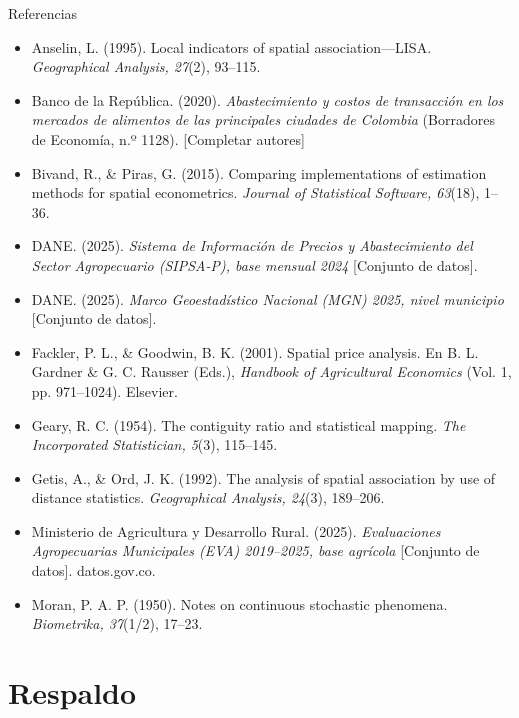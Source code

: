 \documentclass[aspectratio=169,11pt]{beamer}
\begin{document}
\begin{frame}{Referencias}
  \scriptsize
  \begin{itemize}
    \item[] Anselin, L. (1995). Local indicators of spatial association—LISA.
            \textit{Geographical Analysis, 27}(2), 93--115.
    \item[] Banco de la República. (2020). \textit{Abastecimiento y costos de transacción en los
            mercados de alimentos de las principales ciudades de Colombia} (Borradores de
            Economía, n.º 1128). [Completar autores]
    \item[] Bivand, R., \& Piras, G. (2015). Comparing implementations of estimation methods
            for spatial econometrics. \textit{Journal of Statistical Software, 63}(18), 1--36.
    \item[] DANE. (2025). \textit{Sistema de Información de Precios y Abastecimiento del Sector
            Agropecuario (SIPSA-P), base mensual 2024} [Conjunto de datos].
    \item[] DANE. (2025). \textit{Marco Geoestadístico Nacional (MGN) 2025, nivel municipio}
            [Conjunto de datos].
    \item[] Fackler, P. L., \& Goodwin, B. K. (2001). Spatial price analysis. En B. L. Gardner
            \& G. C. Rausser (Eds.), \textit{Handbook of Agricultural Economics} (Vol. 1,
            pp. 971--1024). Elsevier.
    \item[] Geary, R. C. (1954). The contiguity ratio and statistical mapping.
            \textit{The Incorporated Statistician, 5}(3), 115--145.
    \item[] Getis, A., \& Ord, J. K. (1992). The analysis of spatial association by use of
            distance statistics. \textit{Geographical Analysis, 24}(3), 189--206.
    \item[] Ministerio de Agricultura y Desarrollo Rural. (2025). \textit{Evaluaciones
            Agropecuarias Municipales (EVA) 2019--2025, base agrícola} [Conjunto de datos].
            datos.gov.co.
    \item[] Moran, P. A. P. (1950). Notes on continuous stochastic phenomena.
            \textit{Biometrika, 37}(1/2), 17--23.
  \end{itemize}
\end{frame}

\appendix
\section*{Respaldo}
\end{document}
